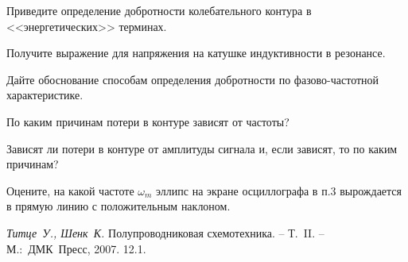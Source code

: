 
\begin{lab:questions}

    \item   Приведите определение добротности колебательного контура в <<энергетических>> терминах.

    \item  Получите выражение для напряжения на катушке индуктивности  в резонансе.

    \item Дайте обоснование способам определения добротности по фазово-частотной характеристике.

    \item По каким причинам потери в контуре зависят от частоты?

    \item * Зависят ли потери в контуре от амплитуды сигнала и, если зависят, то по каким причинам?

    \item * Оцените, на какой частоте $\omega_m$ эллипс на экране осциллографа в п.3 вырождается в прямую линию с положительным наклоном.
\end{lab:questions}



\begin{lab:literature}
    \item \emph{Титце~У., Шенк~К.} Полупроводниковая схемотехника.  – Т.~II. – М.:~ДМК~Пресс, 2007. 12.1.
\end{lab:literature}
